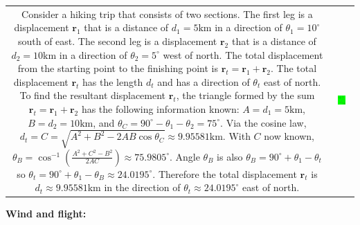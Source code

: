 \documentclass{article}
\begin{document}
\begin{tabular}{cc}
\parbox{0.5\textwidth}{
Consider a hiking trip that consists of two sections. The first leg is a displacement \(\mathbf{r}_1\) that is a distance of \(d_1 = 5\text{km}\) in a direction of \(\theta_1 = 10^\circ\) south of east. The second leg is a displacement \(\mathbf{r}_2\) that is a distance of \(d_2 = 10\text{km}\) in a direction of \(\theta_2 = 5^\circ\) west of north. The total displacement from the starting point to the finishing point is \(\mathbf{r}_t = \mathbf{r}_1 + \mathbf{r}_2\). The total displacement \(\mathbf{r}_t\) has the length \(d_t\) and has a direction of \(\theta_t\) east of north. To find the resultant displacement \(\mathbf{r}_t\), the triangle formed by the sum \(\mathbf{r}_t = \mathbf{r}_1 + \mathbf{r}_2\) has the following information known: \(A = d_1 = 5\text{km}\), \(B = d_2 = 10\text{km}\), and \(\theta_C = 90^\circ - \theta_1 - \theta_2 = 75^\circ\). Via the cosine law, \(d_t = C = \sqrt{A^2 + B^2 - 2AB\cos\theta_C} \approx 9.95581\text{km}\). With \(C\) now known, \(\theta_B = \cos^{-1}\left(\frac{A^2 + C^2 - B^2}{2AC}\right) \approx 75.9805^\circ\). Angle \(\theta_B\) is also \(\theta_B = 90^\circ + \theta_1 - \theta_t\) so \(\theta_t = 90^\circ + \theta_1 - \theta_B \approx 24.0195^\circ\). Therefore the total displacement \(\mathbf{r}_t\) is \(d_t \approx 9.95581\text{km}\) in the direction of \(\theta_t \approx 24.0195^\circ\) east of north.
} & \parbox{0.5\textwidth}{
\includegraphics[width = 0.5\textwidth]{hiking_trip}
}
\end{tabular}



\vspace{5mm}

\textbf{Wind and flight:}
\end{document}
